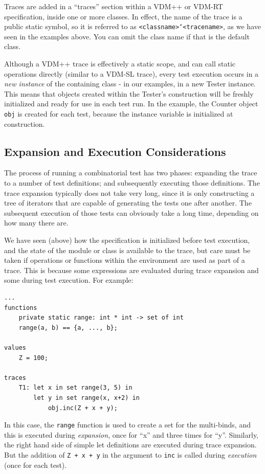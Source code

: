 \documentclass{overturerepchap}
\begin{document}
Traces are added in a ``traces'' section within a VDM++ or VDM-RT
specification, inside one or more classes. In effect, the name of the trace is
a public static symbol, so it is referred to as
\texttt{<classname>`<tracename>}, as we have seen in the examples above. You
can omit the class name if that is the default class.

Although a VDM++ trace is effectively a static scope, and can call static
operations directly (similar to a VDM-SL trace), every test execution occurs in
a \emph{new instance} of the containing class - in our examples, in a new Tester
instance. This means that objects created within the Tester's construction will
be freshly initialized and ready for use in each test run. In the example, the
Counter object \texttt{obj} is created for each test, because the instance
variable is initialized at construction.

\subsection{Expansion and Execution Considerations}

The process of running a combinatorial test has two phases: expanding the trace
to a number of test definitions; and subsequently executing those definitions.
The trace expansion typically does not take very long, since it is only
constructing a tree of iterators that are capable of generating the tests one
after another. The subsequent execution of those tests can obviously take a long
time, depending on how many there are.

We have seen (above) how the specification is initialized before test execution,
and the state of the module or class is available to the trace, but care must be
taken if operations or functions within the environment are used as part of a
trace. This is because some expressions are evaluated during trace expansion and
some during test execution. For example:

\small
\begin{lstlisting}
...
functions
    private static range: int * int -> set of int
    range(a, b) == {a, ..., b};

values
    Z = 100;

traces
    T1: let x in set range(3, 5) in
        let y in set range(x, x+2) in
            obj.inc(Z + x + y);
\end{lstlisting}
\normalsize

In this case, the \texttt{range} function is used to create a set for the
multi-binds, and this is executed during \emph{expansion}, once for ``x'' and three
times for ``y''. Similarly, the right hand side of simple let definitions are
executed during trace expansion. But the addition of \texttt{Z + x + y} in the
argument to \texttt{inc} is called during \emph{execution} (once for each test).
\end{document}
